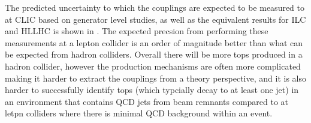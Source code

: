 The predicted uncertainty to which the couplings are expected to be measured to at \ac{CLIC} based on generator level studies, as well as the equivalent results for \ac{ILC} and \ac{HLLHC} is shown in . The expected precsion from performing these measurements at a lepton collider is an order of magnitude better than what can be expected from hadron colliders. Overall there will be more tops produced in a hadron collider, however the production mechanisms are often more complicated making it harder to extract the couplings from a theory perspective, and it is also harder to successfully identify tops (which typcially decay to at least one jet) in an environment that contains \ac{QCD} jets from beam remnants compared to at letpn colliders where there is minimal \ac{QCD} background within an event.


